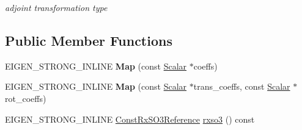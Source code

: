 \begin{DoxyCompactItemize}
\begin{DoxyCompactList}\small\item\em adjoint transformation type \end{DoxyCompactList}\end{DoxyCompactItemize}
\subsection*{Public Member Functions}
\begin{DoxyCompactItemize}
\item 
E\+I\+G\+E\+N\+\_\+\+S\+T\+R\+O\+N\+G\+\_\+\+I\+N\+L\+I\+NE {\bfseries Map} (const \hyperlink{class_eigen_1_1_map_3_01const_01_sophus_1_1_sim3_group_3_01___scalar_01_4_00_01___options_01_4_af8769c2970043ae3c4a88ced33b421a9}{Scalar} $\ast$coeffs)\hypertarget{class_eigen_1_1_map_3_01const_01_sophus_1_1_sim3_group_3_01___scalar_01_4_00_01___options_01_4_af08dcceecb9adf3b91ac39652bc9392c}{}\label{class_eigen_1_1_map_3_01const_01_sophus_1_1_sim3_group_3_01___scalar_01_4_00_01___options_01_4_af08dcceecb9adf3b91ac39652bc9392c}

\item 
E\+I\+G\+E\+N\+\_\+\+S\+T\+R\+O\+N\+G\+\_\+\+I\+N\+L\+I\+NE {\bfseries Map} (const \hyperlink{class_eigen_1_1_map_3_01const_01_sophus_1_1_sim3_group_3_01___scalar_01_4_00_01___options_01_4_af8769c2970043ae3c4a88ced33b421a9}{Scalar} $\ast$trans\+\_\+coeffs, const \hyperlink{class_eigen_1_1_map_3_01const_01_sophus_1_1_sim3_group_3_01___scalar_01_4_00_01___options_01_4_af8769c2970043ae3c4a88ced33b421a9}{Scalar} $\ast$rot\+\_\+coeffs)\hypertarget{class_eigen_1_1_map_3_01const_01_sophus_1_1_sim3_group_3_01___scalar_01_4_00_01___options_01_4_ac57395062f5344a9c75ab856eae26dc2}{}\label{class_eigen_1_1_map_3_01const_01_sophus_1_1_sim3_group_3_01___scalar_01_4_00_01___options_01_4_ac57395062f5344a9c75ab856eae26dc2}

\item 
E\+I\+G\+E\+N\+\_\+\+S\+T\+R\+O\+N\+G\+\_\+\+I\+N\+L\+I\+NE \hyperlink{class_eigen_1_1_map_3_01const_01_sophus_1_1_sim3_group_3_01___scalar_01_4_00_01___options_01_4_a486ddf84534c6214b62fa62540883248}{Const\+Rx\+S\+O3\+Reference} \hyperlink{class_eigen_1_1_map_3_01const_01_sophus_1_1_sim3_group_3_01___scalar_01_4_00_01___options_01_4_a7c2afd35051a3406d96d01b59f169775}{rxso3} () const \hypertarget{class_eigen_1_1_map_3_01const_01_sophus_1_1_sim3_group_3_01___scalar_01_4_00_01___options_01_4_a7c2afd35051a3406d96d01b59f169775}{}\label{class_eigen_1_1_map_3_01const_01_sophus_1_1_sim3_group_3_01___scalar_01_4_00_01___options_01_4_a7c2afd35051a3406d96d01b59f169775}


\end{DoxyCompactItemize}
